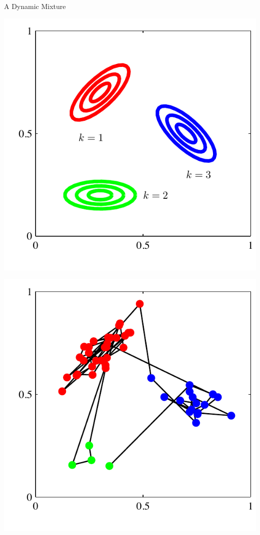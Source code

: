 \documentclass[11pt, mathserif, handout, table]{beamer}
\begin{document}
\begin{frame}{A Dynamic Mixture}
\begin{minipage}{0.45\textwidth}
    \includegraphics[width=\textwidth]{img/mixture_density.pdf}
  \end{minipage}
\hspace{0.1in}
\begin{minipage}{0.45\textwidth}
    \includegraphics[width=\textwidth]{img/state_transitions.pdf}
  \end{minipage}
\end{frame}
\end{document}
